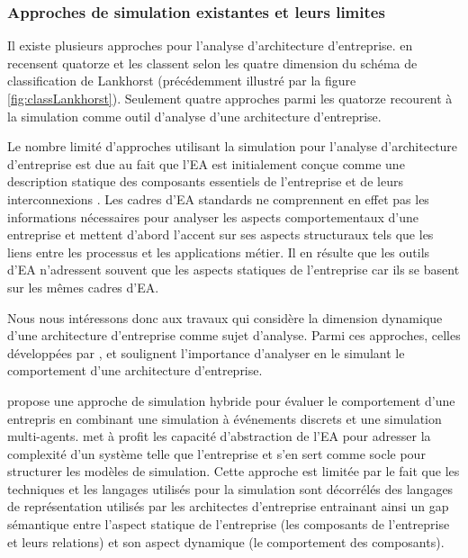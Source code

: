 	\subsubsection{Approches de simulation existantes et leurs limites}
	Il existe plusieurs approches pour l'analyse d'architecture d'entreprise. \cite{manzur2015xarchimate} en recensent quatorze et les classent selon les quatre dimension du schéma de classification de Lankhorst (précédemment illustré par la figure \ref{fig:classLankhorst}). Seulement quatre approches parmi les quatorze recourent à la simulation comme outil d'analyse d'une architecture d'entreprise.

Le nombre limité d'approches utilisant la simulation pour l'analyse d'architecture d'entreprise est due au fait que l'EA est initialement conçue comme une description statique des composants essentiels de l'entreprise et de leurs interconnexions \cite{hoffman2013enterprise}. Les cadres d'EA standards ne comprennent en effet pas les informations nécessaires pour analyser les aspects comportementaux d'une entreprise et mettent d'abord l'accent sur ses aspects structuraux tels que les liens entre les processus et les applications métier. Il en résulte que les outils d'EA n'adressent souvent que les aspects statiques de l'entreprise car ils se basent sur les mêmes cadres d'EA.


Nous nous intéressons donc aux travaux qui considère la dimension dynamique d'une architecture d'entreprise comme sujet d'analyse. Parmi ces approches, celles développées par \cite{glazner2011enterprise}, \cite{ludwig2011organizational} et \cite{manzur2015xarchimate} soulignent l'importance d'analyser en le simulant le comportement d'une architecture d'entreprise. 

\cite{glazner2011enterprise} propose une approche de simulation hybride pour évaluer le comportement d'une entrepris en combinant une simulation à événements discrets et une simulation multi-agents. \cite{glazner2011enterprise} met à profit les capacité d'abstraction de l'EA pour adresser la complexité d'un système telle que l'entreprise et s'en sert comme socle pour structurer les modèles de simulation. Cette approche est limitée par le fait que les techniques et les langages utilisés pour la simulation sont décorrélés des langages de représentation utilisés par les architectes d'entreprise entrainant ainsi un gap sémantique entre l'aspect statique de l'entreprise (les composants de l'entreprise et leurs relations) et son aspect dynamique (le comportement des composants).  

